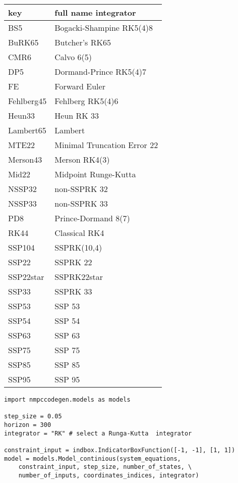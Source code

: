 \begin{center}
	\begin{tabular}{ll}
		\hline
		key        & full name integrator \\
		\hline
		BS5        & Bogacki-Shampine RK5(4)8    \\
		BuRK65     & Butcher's RK65              \\
		CMR6       & Calvo 6(5)                  \\
		DP5        & Dormand-Prince RK5(4)7      \\
		FE         & Forward Euler               \\
		Fehlberg45 & Fehlberg RK5(4)6            \\
		Heun33     & Heun RK 33                  \\
		Lambert65  & Lambert                     \\
		MTE22      & Minimal Truncation Error 22 \\
		Merson43   & Merson RK4(3)               \\
		Mid22      & Midpoint Runge-Kutta        \\
		NSSP32     & non-SSPRK 32                \\
		NSSP33     & non-SSPRK 33                \\
		PD8        & Prince-Dormand 8(7)         \\
		RK44       & Classical RK4               \\
		SSP104     & SSPRK(10,4)                 \\
		SSP22      & SSPRK 22                    \\
		SSP22star  & SSPRK22star                 \\
		SSP33      & SSPRK 33                    \\
		SSP53      & SSP 53                      \\
		SSP54      & SSP 54                      \\
		SSP63      & SSP 63                      \\
		SSP75      & SSP 75                      \\
		SSP85      & SSP 85                      \\
		SSP95      & SSP 95                      \\
		\hline
	\end{tabular}
	\label{tab:integrators}	
\end{center}

\begin{lstlisting}[caption={Continue model},captionpos=b,label={lst:continious model}]
import nmpccodegen.models as models

step_size = 0.05
horizon = 300
integrator = "RK" # select a Runga-Kutta  integrator

constraint_input = indbox.IndicatorBoxFunction([-1, -1], [1, 1])  
model = models.Model_continious(system_equations,
	constraint_input, step_size, number_of_states, \
	number_of_inputs, coordinates_indices, integrator)
\end{lstlisting}

